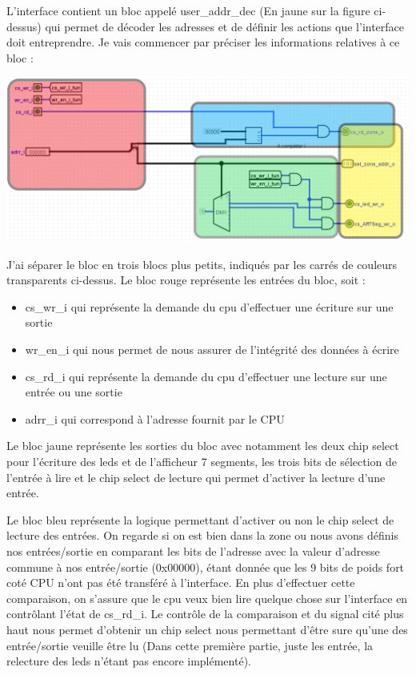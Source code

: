 L'interface contient un bloc appelé user\_addr\_dec (En jaune sur la figure ci-dessus) qui permet de décoder les adresses et de définir les actions que l'interface doit entreprendre. Je vais commencer par préciser les informations relatives à ce bloc : \\
\begin{center}
\includegraphics[scale=0.4]{./images/decod_partie1.png}\\\par
{}
\end{center}\par
J'ai séparer le bloc en trois blocs plus petits, indiqués par les carrés de couleurs transparents ci-dessus. Le bloc rouge représente les entrées du bloc, soit :
\begin{itemize}
\item cs\_wr\_i qui représente la demande du cpu d'effectuer une écriture sur une sortie
\item wr\_en\_i qui nous permet de nous assurer de l'intégrité des données à écrire
\item cs\_rd\_i qui représente la demande du cpu d'effectuer une lecture sur une entrée ou une sortie
\item adrr\_i qui correspond à l'adresse fournit par le CPU\\
\end{itemize}\par
Le bloc jaune représente les sorties du bloc avec notamment les deux chip select pour l'écriture des leds et de l'afficheur 7 segments, les trois bits de sélection de l'entrée à lire et le chip select de lecture qui permet d'activer la lecture d'une entrée.\\\par
Le bloc bleu représente la logique permettant d'activer ou non le chip select de lecture des entrées. On regarde si on est bien dans la zone ou nous avons définis nos entrées/sortie en comparant les bits de l'adresse avec la valeur d'adresse commune à nos entrée/sortie (0x00000), étant donnée que les 9 bits de poids fort coté CPU n'ont pas été transféré à l'interface. En plus d'effectuer cette comparaison, on s'assure que le cpu veux bien lire quelque chose sur l'interface en contrôlant l'état de cs\_rd\_i. Le contrôle de la comparaison et du signal cité plus haut nous permet d'obtenir un chip select nous permettant d'être sure qu'une des entrée/sortie veuille être lu (Dans cette première partie, juste les entrée, la relecture des leds n'étant pas encore implémenté).\\\par
